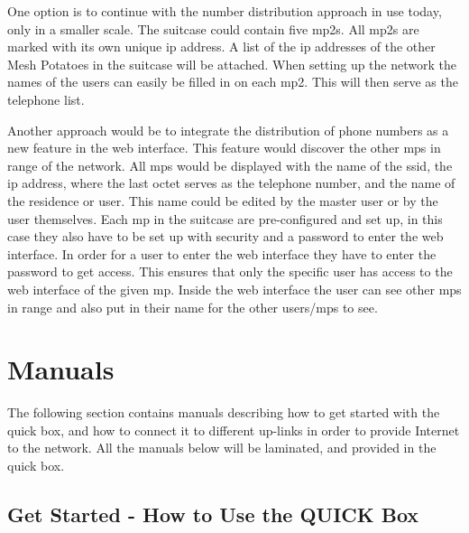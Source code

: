 One option is to continue with the number distribution approach in use today, only in a smaller scale. The suitcase could contain five \glspl{mp2}. All \glspl{mp2} are marked with its own unique \gls{ip} address. A list of the \gls{ip} addresses of the other Mesh Potatoes in the suitcase will be attached. When setting up the network the names of the users can easily be filled in on each \gls{mp2}. This will then serve as the telephone list. 

Another approach would be to integrate the distribution of phone numbers as a new feature in the web interface. This feature would discover the other \glspl{mp} in range of the network. All \glspl{mp} would be displayed with the name of the \gls{ssid}, the \gls{ip} address, where the last octet serves as the telephone number, and the name of the residence or user. This name could be edited by the master user or by the user themselves. Each \gls{mp} in the suitcase are pre-configured and set up, in this case they also have to be set up with security and a password to enter the web interface. In order for a user to enter the web interface they have to enter the password to get access. This ensures that only the specific user has access to the web interface of the given \gls{mp}. Inside the web interface the user can see other \glspl{mp} in range and also put in their name for the other users/\glspl{mp} to see. 



\section{Manuals}
The following section contains manuals describing how to get started with the \gls{quick} box, and how to connect it to different up-links in order to provide Internet to the network. All the manuals below will be laminated, and provided in the \gls{quick} box. 
\clearpage
\subsection{Get Started - How to Use the QUICK Box}

\clearpage
